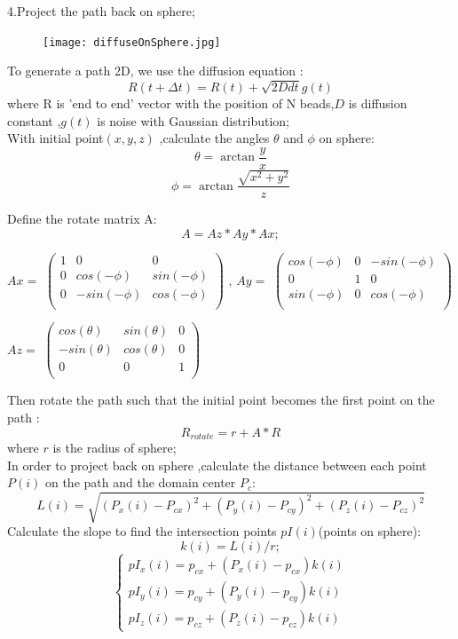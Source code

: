 \documentclass{article}
\begin{document}
4.Project the path back on sphere;\\
\begin{figure}[H]
\texttt{[image: diffuseOnSphere.jpg]}	
\end{figure}
To generate a path 2D, we use the diffusion equation :\\
\begin{equation}
R(t+\Delta t) = R(t)+\sqrt{2Ddt}g(t)
\end{equation}
where R is 'end to end' vector with the position of N beads,$D$ is diffusion constant ,$g(t)$ is noise with Gaussian distribution;\\

With initial point$(x,y,z)$ ,calculate the angles $\theta$ and $\phi$ on sphere:\\
\[
\theta=\arctan{\frac{y}{x}}
\]
\[
\phi  =\arctan{\frac{\sqrt{x^2+y^2}}{z}}
\]

Define the rotate matrix A:\\
\begin{equation}
A = Az*Ay*Ax;
\end{equation}

$Ax =$
$\begin{pmatrix}1&0&0\\ 
	0&cos(-\phi)&sin(-\phi)\\ 
	0&-sin(-\phi)&cos(-\phi)\\ 
\end{pmatrix}$ ,
$Ay=$
$\begin{pmatrix}cos(-\phi)&0&-sin(-\phi)\\ 
0&1&0\\ 
sin(-\phi)&0&cos(-\phi)\\ 
\end{pmatrix}$

$Az=$
$\begin{pmatrix} 
cos(\theta)&sin(\theta)&0\\
-sin(\theta)&cos(\theta)&0\\ 
0&0&1\\ 
\end{pmatrix}$

Then rotate the path such that the initial point becomes the first point on the path :\\
\[
R_{rotate} = r+A*R
\]
where $r$ is the radius of sphere;\\

In order to project back on sphere ,calculate the distance between each point $P(i)$ on the path and the domain center $P_c$:\\
\[
L(i)=\sqrt{(P_x(i)-P_{cx})^2+(P_y(i)-P_{cy})^2+(P_z(i)-P_{cz})^2}
\]
Calculate the slope to find the intersection points $pI(i)$(points on sphere):\\
\[
k(i)=L(i)/r;
\]
\begin{equation}
\begin{cases}
pI_x(i)=p_{cx}+(P_x(i)-p_{cx})k(i)\\
pI_y(i)=p_{cy}+(P_y(i)-p_{cy})k(i)\\
pI_z(i)=p_{cz}+(P_z(i)-p_{cz})k(i)
\end{cases}
\end{equation}
\end{document}
